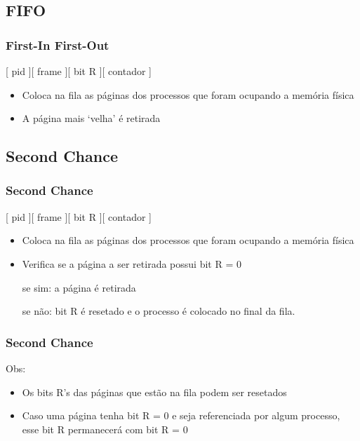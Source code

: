 \documentclass{beamer}
\begin{document}
\subsection{FIFO} 
\begin{frame}
\frametitle{First-In First-Out}

\begin{center}
[ pid ][ frame ][ bit R ][ contador ]
\end{center}

\begin{itemize}
\item Coloca na fila as páginas dos processos que foram ocupando a memória física

\item A página mais ‘velha’ é retirada
\end{itemize}
\justifying

\end{frame}

\subsection{Second Chance} 
\begin{frame}
\frametitle{Second Chance}

\begin{center}
[ pid ][ frame ][ bit R ][ contador ]
\end{center}

\begin{itemize}
\item Coloca na fila as páginas dos processos que foram ocupando a memória física

\item Verifica se a página a ser retirada possui bit R = 0

se sim: a página é retirada

se não: bit R é resetado e o processo é colocado no final da fila.
\end{itemize}
\justifying
\end{frame}

\begin{frame}
\frametitle{Second Chance}
Obs:
\begin{itemize}
\item Os bits R’s das páginas que estão na fila podem ser resetados

\item Caso uma página tenha bit R = 0 e seja referenciada por algum processo, esse bit R permanecerá com bit R = 0
\end{itemize}
\justifying
\end{frame}
\end{document}
